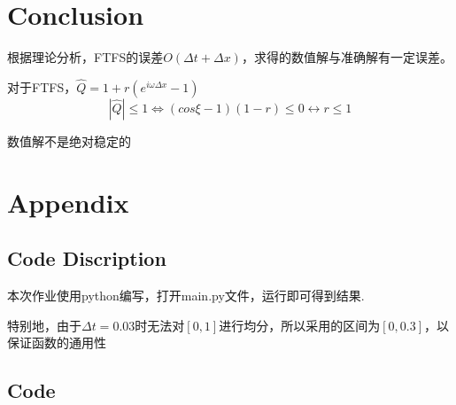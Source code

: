 \documentclass{article}
\begin{document}
\section{Conclusion}
根据理论分析，FTFS的误差$O(\Delta t+\Delta x)$，求得的数值解与准确解有一定误差。

对于FTFS，$\hat{Q}=1+r(e^{i\omega \Delta x}-1)$
$$|\hat{Q}|\leq 1\Leftrightarrow (cos\xi-1)(1-r)\leq 0\leftrightarrow r\leq 1$$

数值解不是绝对稳定的

\section{Appendix}
\subsection{Code Discription}

本次作业使用python编写，打开main.py文件，运行即可得到结果.

特别地，由于$\Delta t=0.03$时无法对$[0,1]$进行均分，所以采用的区间为$[0,0.3]$，以保证函数的通用性

\subsection{Code}

\end{document}
